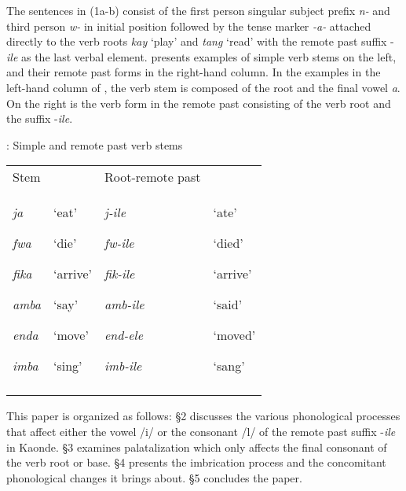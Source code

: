 \documentclass[output=paper]{langsci/langscibook}
\begin{document}
The sentences in (1a-b) consist of the first person singular subject prefix \emph{n-} and third person \emph{w-} in initial position followed by the tense marker \emph{{}-a-} attached directly to the verb roots \emph{kay} ‘play’ and \textit{tang} ‘read’ with the remote past suffix -\emph{ile} as the last verbal element.  presents examples of simple verb stems on the left, and their remote past forms in the right-hand column. In the examples in the left-hand column of , the verb stem is composed of the root and the final vowel \textit{a}. On the right is the verb form in the remote past consisting of the verb root and the suffix -\textit{ile}.


 : Simple and remote past verb stems


\begin{tabular}{llll}
\lsptoprule
\mdseries Stem &  & \mdseries Root-remote past & \\
{\mdseries \emph{ja }}

{\mdseries \emph{fwa }}

{\mdseries \emph{fika }}

{\mdseries \emph{amba }}

{\mdseries \emph{enda }}

\mdseries \emph{imba} & {\mdseries ‘eat’}

{\mdseries ‘die’}

{\mdseries ‘arrive’  }

{\mdseries ‘say’}

{\mdseries ‘move’  }

\mdseries ‘sing’ & {\mdseries \emph{j-ile}}

{\mdseries \emph{fw-ile}}

{\mdseries \emph{fik-ile}}

{\mdseries \emph{amb-ile}}

{\mdseries \emph{end-ele  }}

\mdseries \emph{imb-ile  } & {\mdseries ‘ate’}

{\mdseries ‘died’}

{\mdseries ‘arrive’}

{\mdseries ‘said’}

{\mdseries ‘moved’}

\mdseries ‘sang’\\
\lspbottomrule
\end{tabular}
\begin{styleBodyTextIndent}
This paper is organized as follows: §2 discusses the various phonological processes that affect either the vowel /i/ or the consonant /l/ of the remote past suffix -\emph{ile} in Kaonde. §3 examines palatalization which only affects the final consonant of the verb root or base. §4 presents the imbrication process and the concomitant phonological changes it brings about. §5 concludes the paper.
\end{styleBodyTextIndent}
\end{document}
